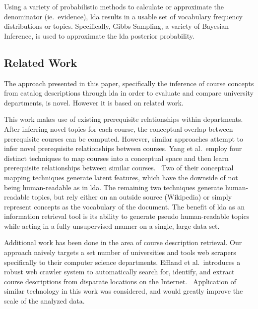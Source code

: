
\noindent
Using a variety of probabilistic methods to calculate or approximate the denominator (ie.\ evidence), \ac{lda} results in a usable set of vocabulary frequency distributions or topics.
Specifically, Gibbs Sampling, a variety of Bayesian Inference, is used to approximate the \ac{lda} posterior probability.~\cite{Blei2003}


\subsection{Related Work}
\label{sec:related-work}


The approach presented in this paper, specifically the inference of course concepts from catalog descriptions through \ac{lda} in order to evaluate and compare university departments, is novel.
However it is based on related work.


This work makes use of existing prerequisite relationships within departments.
After inferring novel topics for each course, the conceptual overlap between prerequisite courses can be computed.
However, similar approaches attempt to infer novel prerequisite relationships between courses.
Yang et al.\ employ four distinct techniques to map courses into a conceptual space and then learn prerequisite relationships between similar courses.~\citep{Yang2015}
Two of their conceptual mapping techniques generate latent features, which have the downside of not being human-readable as in \ac{lda}.
The remaining two techniques generate human-readable topics, but rely either on an outside source (Wikipedia) or simply represent concepts as the vocabulary of the document.
The benefit of \ac{lda} as an information retrieval tool is its ability to generate pseudo human-readable topics while acting in a fully unsupervised manner on a single, large data set.


Additional work has been done in the area of course description retrieval.
Our approach naively targets a set number of universities and tools web scrapers specifically to their computer science departments.
Effland et al.\ introduces a robust web crawler system to automatically search for, identify, and extract course descriptions from disparate locations on the Internet.~\cite{Effland2015}
Application of similar technology in this work was considered, and would greatly improve the scale of the analyzed data.



